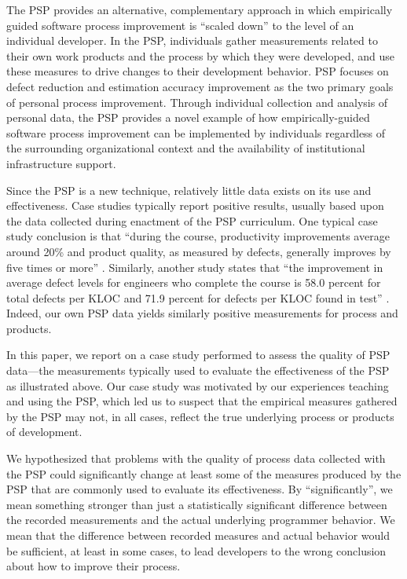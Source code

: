 The PSP provides an alternative, complementary approach in which
empirically guided software process improvement is ``scaled down'' to the
level of an individual developer.  In the PSP, individuals gather
measurements related to their own work products and the process by which
they were developed, and use these measures to drive changes to their
development behavior.  PSP focuses on defect reduction and
estimation accuracy improvement as the two primary goals of personal
process improvement. Through individual collection and analysis of personal
data, the PSP provides a novel example of how empirically-guided software
process improvement can be implemented by individuals regardless of the
surrounding organizational context and the availability of institutional
infrastructure support.

Since the PSP is a new technique, relatively little data exists on its use
and effectiveness.  Case studies typically report positive results, usually
based upon the data collected during enactment of the PSP curriculum.  One
typical case study conclusion is that ``during the course, productivity
improvements average around 20\% and product quality, as measured by
defects, generally improves by five times or more'' \cite{Ferguson97}.
Similarly, another study states that ``the improvement in average defect
levels for engineers who complete the course is 58.0 percent for total defects
per KLOC and 71.9 percent for defects per KLOC found in test''
\cite{Humphrey96}.  Indeed, our own
PSP data yields similarly positive measurements for process and products.

In this paper, we report on a case study performed to assess the quality of
PSP data---the measurements typically used to evaluate the effectiveness of
the PSP as illustrated above.  Our case study was motivated by our
experiences teaching and using the PSP, which led us to suspect that the
empirical measures gathered by the PSP may not, in all cases, reflect the
true underlying process or products of development.

We hypothesized that problems with the quality of process data collected
with the PSP could significantly change at least some of the measures
produced by the PSP that are commonly used to evaluate its effectiveness.
By ``significantly'', we mean something stronger than just a statistically
significant difference between the recorded measurements and the actual
underlying programmer behavior. We mean that the difference between
recorded measures and actual behavior would be sufficient, at least in some
cases, to lead developers to the wrong conclusion about how to improve
their process.

